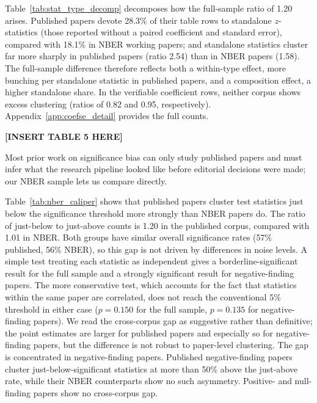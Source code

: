 \documentclass[12pt]{article}
\begin{document}
Table~\ref{tab:stat_type_decomp} decomposes how the full-sample
ratio of 1.20 arises.  Published papers devote 28.3\% of their
table rows to standalone $z$-statistics (those reported without a
paired coefficient and standard error), compared with 18.1\% in
NBER working papers; and standalone statistics cluster far more
sharply in published papers (ratio 2.54) than in NBER papers
(1.58).  The full-sample difference therefore reflects both a
within-type effect, more bunching per standalone statistic in
published papers, and a composition effect, a higher standalone
share.  In the verifiable coefficient rows, neither corpus shows
excess clustering (ratios of 0.82 and 0.95, respectively).
Appendix~\ref{app:coefse_detail} provides the full counts.


\begin{center}
\textbf{[INSERT TABLE 5 HERE]}
\end{center}

Most prior work on significance bias can only study published papers
and must infer what the research pipeline looked like before editorial
decisions were made; our NBER sample lets us compare directly.

Table~\ref{tab:nber_caliper} shows that published papers cluster
test statistics just below the significance threshold more strongly
than NBER papers do.  The ratio of just-below to just-above counts
is 1.20 in the published corpus, compared with 1.01 in NBER.  Both
groups have similar overall significance rates (57\% published,
56\% NBER), so this gap is not driven by differences in noise
levels.  A simple test treating each statistic as independent gives
a borderline-significant result for the full sample and a strongly
significant result for negative-finding papers.  The more conservative
test, which accounts for the fact that statistics within the same
paper are correlated, does not reach the conventional 5\% threshold
in either case ($p = 0.150$ for the full sample, $p = 0.135$ for
negative-finding papers).  We read the cross-corpus gap as
suggestive rather than definitive; the point estimates are larger
for published papers and especially so for negative-finding papers,
but the difference is not robust to paper-level clustering.  The
gap is concentrated in negative-finding papers.  Published
negative-finding papers cluster just-below-significant statistics
at more than 50\% above the just-above rate, while their NBER
counterparts show no such asymmetry.  Positive- and null-finding
papers show no cross-corpus gap.
\end{document}
